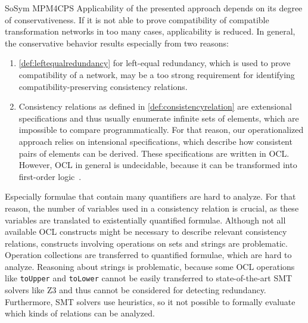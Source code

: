 \begin{copiedFrom}{SoSym MPM4CPS}
Applicability of the presented approach depends on its degree of conservativeness.
If it is not able to prove compatibility of compatible transformation networks in too many cases, applicability is reduced.
In general, the conservative behavior results especially from two reasons:
\begin{enumerate}
    \item \autoref{def:leftequalredundancy} for left-equal redundancy, which is used to prove compatibility of a network, may be a too strong requirement for identifying compatibility-preserving consistency relations.
    \item Consistency relations as defined in \autoref{def:consistencyrelation} are extensional specifications and thus usually enumerate infinite sets of elements, which are impossible to compare programmatically.
    For that reason, our operationalized approach relies on intensional specifications, which describe how consistent pairs of elements can be derived.
    These specifications are written in OCL. 
    However, OCL in general is undecidable, because it can be transformed into first-order logic~\cite{beckert2002ocltranslation}.
\end{enumerate}
Especially formulae that contain many quantifiers are hard to analyze.
For that reason, the number of variables used in a consistency relation is crucial, as these variables are translated to existentially quantified formulae.
Although not all available OCL constructs might be necessary to describe relevant consistency relations, constructs involving operations on sets and strings are problematic.
Operation collections are transferred to quantified formulae, which are hard to analyze.
Reasoning about strings is problematic, because some OCL operations like \texttt{toUpper} and \texttt{toLower} cannot be easily transferred to state-of-the-art SMT solvers like Z3 and thus cannot be considered for detecting redundancy.
Furthermore, SMT solvers use heuristics, so it not possible to formally evaluate which kinds of relations can be analyzed.


\end{copiedFrom}
